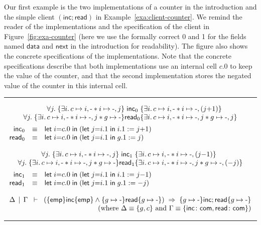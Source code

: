 \documentclass{LMCS}
\newcommand{\com}{\mathsf{com}}
\newcommand{\mletin}[2]{\mathsf{let}\;{#1}\;\mathsf{in}\;{#2}}
\newcommand{\blank}{\mbox{-}}
\newcommand{\emp}{\mathsf{emp}}
\newcommand{\pointsto}{\mapsto}
\newcommand{\mtri}[3]{\{{#1}\}{#2}\{{#3}\}}
\newcommand{\inc}{\mathsf{inc}}
\newcommand{\mread}{\mathsf{read}}
\newcommand{\data}{\mathsf{data}}
\newcommand{\mnext}{\mathsf{next}}
\begin{document}
Our first example is the two implementations of a counter in
the introduction and the simple client $(\inc;\mread)$ in 
Example~\ref{exa:client-counter}. We remind the reader of
the implementations and the specification of the client in 
Figure~\ref{fig:exa-counter} (here we use the formally
correct 0 and 1 for the
fields named $\data$ and $\mnext$ in the introduction for
readability).
The figure also shows the concrete specifications of the
implementations. Note that the concrete specifications
describe that both implementations
use an internal cell $c.0$ to keep the value of the counter,
and that the second implementation stores the negated value
of the counter in this internal cell.

\begin{figure*}[t]
\hrule
$$
\begin{array}{rcl}
\multicolumn{3}{c}{
\begin{array}{@{}r@{}c@{}l@{}}
    \forall j.\; 
    \{\exists i.\,c\pointsto i,\blank * i\pointsto \blank,j\}
    & \inc_0 &
   \{\exists i.\,c\pointsto i,\blank * i\pointsto \blank,(j{+}1)\} 
\\
   \forall j.\;
   \{\exists i.\,c\pointsto i,\blank * i\pointsto \blank,j * g \pointsto \blank\}
    & \mread_0 &
    \{\exists i.\,c\pointsto i,\blank * i \pointsto \blank,j * g \pointsto \blank,j\}
\end{array}
}
\\[2.5ex]
    \inc_0 & \equiv & \mletin{i{=}c.0}{(\mletin{j{=}i.1}{i.1 := j{+}1})}
\\
    \mread_0 & \equiv & \mletin{i{=}c.0}{(\mletin{j{=}i.1}{g.1 := j})}
\\
\\
\multicolumn{3}{c}{
\begin{array}{@{}r@{}c@{}l@{}}
   \forall j.\; 
    \{\exists i.\,c\pointsto i,\blank * i\pointsto \blank,j\}
    & \inc_1 &
   \{\exists i.\,c\pointsto i,\blank * i\pointsto \blank,(j{-}1)\} 
\\
   \forall j.\; 
    \{\exists i.\,c\pointsto i,\blank * i\pointsto \blank,j * g \pointsto \blank\}
    & \mread_1 &
    \{\exists i.\,c\pointsto i,\blank * i \pointsto \blank,j * g \pointsto \blank,({-}j)\}
\end{array}
}
\\[2.5ex]
    \inc_1 & \equiv & \mletin{i{=}c.0}{(\mletin{j{=}i.1}{i.1 := j{-}1})}
\\
    \mread_1 & \equiv & \mletin{i{=}c.0}{(\mletin{j{=}i.1}{g.1 := {-}j})}
\\
\\
\multicolumn{3}{c}{
     \Delta \,\mid\, \Gamma \;\;\vdash\;\; 
     (\mtri{\emp}{\inc}{\emp}\land
      \mtri{g\pointsto\blank}{\mread}{g\pointsto\blank})
     \;\Rightarrow\; 
     \mtri{g\pointsto\blank}{\inc;\mread}{g\pointsto \blank}
}
\\
\multicolumn{3}{r}{
  \hfill(\mbox{where $\Delta \equiv \{g,c\}$ and
  $\Gamma \equiv \{\inc\colon \com, 
              \mread \colon\com\}$})
}
\end{array}
$$
\hrule
\caption{Two Implementations of a Counter and a Simple Client}
\label{fig:exa-counter}
\end{figure*}
\end{document}
